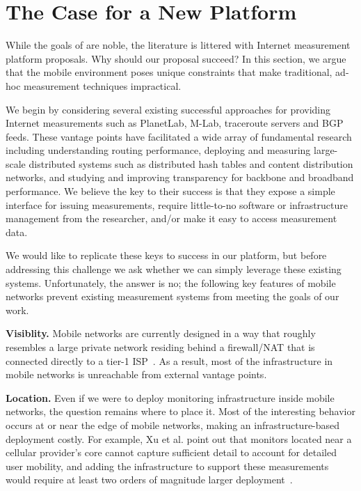 \section{The Case for a New Platform}
While the goals of \mobilelab are noble, the literature is littered with Internet measurement platform 
proposals. Why should our proposal succeed? In this section, we argue that the 
mobile environment poses unique constraints that make traditional, ad-hoc measurement techniques impractical. 

We begin by considering several existing successful approaches for providing 
Internet measurements such as PlanetLab, M-Lab, traceroute servers and BGP feeds. 
These vantage points have facilitated 
a wide array of fundamental research including understanding routing performance, deploying and measuring 
large-scale distributed systems such as distributed hash tables and content distribution networks, and 
studying and improving transparency for backbone and broadband performance. We believe the 
key to their success is that they expose a simple interface for issuing measurements, 
require little-to-no software or infrastructure management from the researcher, 
and/or make it easy to access measurement data. 

We would like to replicate these 
keys to success in our platform, but before addressing this challenge we ask 
whether we can simply leverage these existing systems. Unfortunately, the answer is no; 
the following key features of mobile networks prevent existing measurement 
systems from meeting the goals of our work.

\noindent\textbf{Visiblity.} Mobile networks are currently designed in a way that roughly resembles a 
large private network residing behind a firewall/NAT that is connected 
directly to a tier-1 ISP~\cite{wang:middleboxes}. As a result, most of the infrastructure in 
mobile networks is unreachable from external vantage points.  

\noindent\textbf{Location.} Even if we were to deploy monitoring 
infrastructure inside  mobile networks, the question remains 
where to place it. Most of the interesting behavior occurs 
at or near the edge of mobile networks, making an infrastructure-based 
deployment costly. For example, Xu et al. point out that 
monitors located near a cellular provider's core cannot capture 
sufficient detail to account for detailed user mobility, and 
adding the infrastructure to support these measurements would 
require at least two orders of magnitude larger deployment~\cite{xu:acculoc}. 

